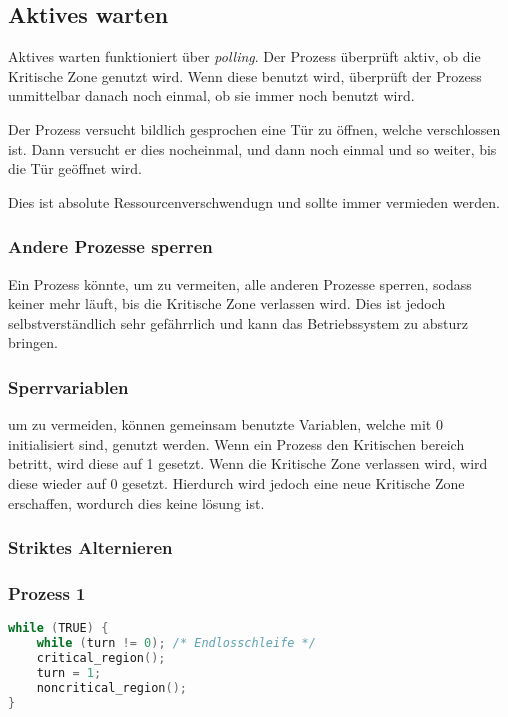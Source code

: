 \subsection{Aktives warten}
\label{aktives_warten}

Aktives warten funktioniert über \textit{polling}. Der Prozess überprüft aktiv, ob die Kritische Zone genutzt wird. Wenn diese benutzt wird, überprüft der Prozess unmittelbar danach noch einmal, ob sie immer noch benutzt wird.

Der Prozess versucht bildlich gesprochen eine Tür zu öffnen, welche verschlossen ist. Dann versucht er dies nocheinmal, und dann noch einmal und so weiter, bis die Tür geöffnet wird.

Dies ist absolute Ressourcenverschwendugn und sollte immer vermieden werden.

\subsubsection{Andere Prozesse sperren}

Ein Prozess könnte, um  zu vermeiten, alle anderen Prozesse sperren, sodass keiner mehr läuft, bis die Kritische Zone verlassen wird. Dies ist jedoch selbstverständlich sehr gefährrlich und kann das Betriebssystem zu absturz bringen.

\subsubsection{Sperrvariablen}

um  zu vermeiden, können gemeinsam benutzte Variablen, welche mit 0 initialisiert sind, genutzt werden. Wenn ein Prozess den Kritischen bereich betritt, wird diese auf 1 gesetzt. Wenn die Kritische Zone verlassen wird, wird diese wieder auf 0 gesetzt. Hierdurch wird jedoch eine neue Kritische Zone erschaffen, wordurch dies keine lösung ist.

\subsubsection{Striktes Alternieren}

\subsubsection*{Prozess 1}

\begin{lstlisting}[language=C]
while (TRUE) {
    while (turn != 0); /* Endlosschleife */
    critical_region();
    turn = 1;
    noncritical_region();
} 
\end{lstlisting}

